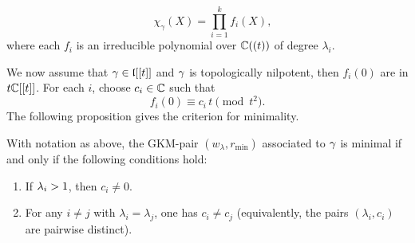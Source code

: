 \documentclass[11pt]{article}
\numberwithin{equation}{section}
\begin{document}
\begin{equation}\label{R}
\quad
\chi_\gamma(X)=\prod_{i=1}^{k} f_i(X),
\end{equation}
where each $f_i$ is an irreducible polynomial over $\mathbb{C}((t))$ of degree $\lambda_i$.

We now assume that $\gamma\in \mathfrak{l}[[t]]$ and $\gamma$ is topologically nilpotent, then $f_i(0)$ are in $t\mathbb{C}[[t]]$. For each $i$, choose $c_i\in\mathbb{C}$ such that
\[
f_i(0) \equiv c_i\,t \pmod{t^2}.
\]
The following proposition gives the criterion for minimality. 
\begin{pro}\label{mingkm}
With notation as above, the GKM-pair
$(w_\lambda,r_{\min})$ associated to $\gamma$ is minimal if and only if the following conditions hold:
\begin{enumerate}
\item If $\lambda_i>1$, then $c_i\neq 0$.
\item For any $i\neq j$ with $\lambda_i=\lambda_j$, one has $c_i\neq c_j$
(equivalently, the pairs $(\lambda_i,c_i)$ are pairwise distinct).
\end{enumerate}
\end{pro}
\end{document}
